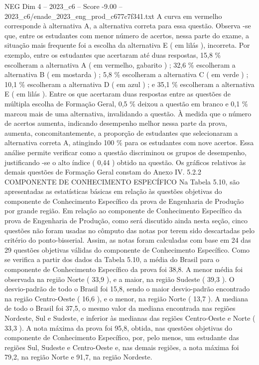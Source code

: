 \begin{textsample}{NEG Dim 4 – 2023\_c6 – Score -9.00 – 2023\_c6/enade\_2023\_eng\_prod\_c677c7f341.txt}
A curva em vermelho corresponde à alternativa A, a alternativa correta para essa questão.
Observa -se que, entre os estudantes com menor número de acertos, nessa parte do exame, a situação mais frequente foi a escolha da alternativa E ( em lilás ), incorreta.
Por exemplo, entre os estudantes que acertaram até duas respostas, 15,8 \% escolheram a alternativa A ( em vermelho, gabarito ) ; 32,6 \% escolheram a alternativa B ( em mostarda ) ; 5,8 \% escolheram a alternativa C ( em verde ) ; 10,1 \% escolheram a alternativa D ( em azul ) ; e 35,1 \% escolheram a alternativa E ( em lilás ).
Entre os que acertaram duas respostas entre as questões de múltipla escolha de Formação Geral, 0,5 \% deixou a questão em branco e 0,1 \% marcou mais de uma alternativa, invalidando a questão.
À medida que o número de acertos aumenta, indicando desempenho melhor nessa parte da prova, aumenta, concomitantemente, a proporção de estudantes que selecionaram a alternativa correta A, atingindo 100 \% para os estudantes com nove acertos.
Essa análise permite verificar como a questão discriminou os grupos de desempenho, justificando -se o alto índice ( 0,44 ) obtido na questão.
Os gráficos relativos às demais questões de Formação Geral constam do Anexo IV. 5.2.2 COMPONENTE DE CONHECIMENTO ESPECÍFICO Na Tabela 5.10, são apresentadas as estatísticas básicas em relação às questões objetivas do componente de Conhecimento Específico da prova de Engenharia de Produção por grande região.
Em relação ao componente de Conhecimento Específico da prova de Engenharia de Produção, como será discutido ainda nesta seção, cinco questões não foram usadas no cômputo das notas por terem sido descartadas pelo critério do ponto-bisserial.
Assim, as notas foram calculadas com base em 24 das 29 questões objetivas válidas do componente de Conhecimento Específico.
Como se verifica a partir dos dados da Tabela 5.10, a média do Brasil para o componente de Conhecimento Específico da prova foi 38,8.
A menor média foi observada na região Norte ( 33,9 ), e a maior, na região Sudeste ( 39,3 ).
O desvio-padrão de todo o Brasil foi 15,8, sendo o maior desvio-padrão encontrado na região Centro-Oeste ( 16,6 ), e o menor, na região Norte ( 13,7 ).
A mediana de todo o Brasil foi 37,5, o mesmo valor da mediana encontrada nas regiões Nordeste, Sul e Sudeste, e inferior às medianas das regiões Centro-Oeste e Norte ( 33,3 ).
A nota máxima da prova foi 95,8, obtida, nas questões objetivas do componente de Conhecimento Específico, por, pelo menos, um estudante das regiões Sul, Sudeste e Centro-Oeste e, nas demais regiões, a nota máxima foi 79,2, na região Norte e 91,7, na região Nordeste.

\end{textsample}
